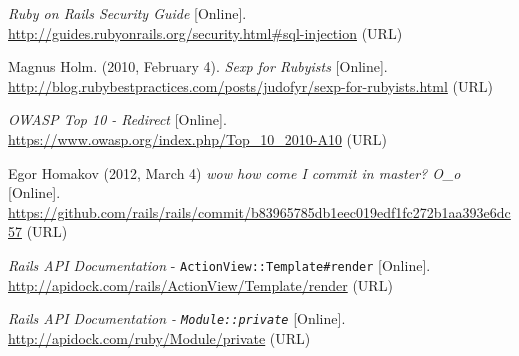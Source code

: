 \documentclass[conference]{IEEEtran}
\begin{document}
\begin{thebibliography}{1}
    \emph{Ruby on Rails Security Guide} [Online]. \url{http://guides.rubyonrails.org/security.html\#sql-injection} (URL)

    Magnus Holm. (2010, February 4). \emph{Sexp for Rubyists} [Online]. \url{http://blog.rubybestpractices.com/posts/judofyr/sexp-for-rubyists.html} (URL)

    \emph{OWASP Top 10 - Redirect} [Online]. \url{https://www.owasp.org/index.php/Top_10_2010-A10} (URL)

    Egor Homakov (2012, March 4) \emph{wow how come I commit in master? O\_o} [Online]. \url{https://github.com/rails/rails/commit/b83965785db1eec019edf1fc272b1aa393e6dc57} (URL)

    \emph{Rails API Documentation} - \texttt{ActionView::Template\#render} [Online]. \url{http://apidock.com/rails/ActionView/Template/render} (URL)

    \emph{Rails API Documentation - \texttt{Module::private}} [Online]. \url{http://apidock.com/ruby/Module/private} (URL)

\end{thebibliography}
\end{document}
